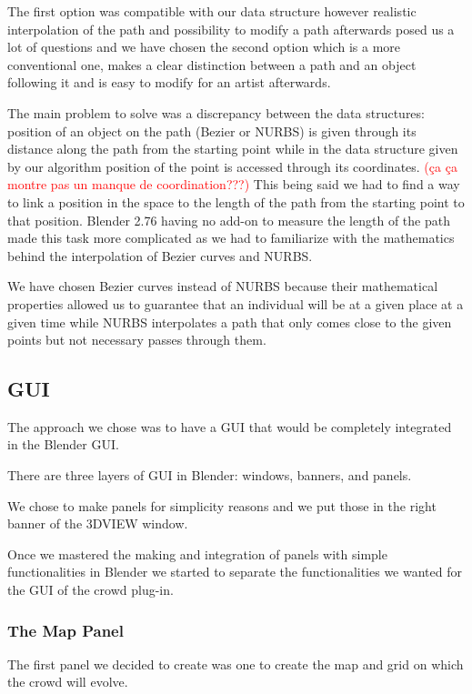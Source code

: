 The first option was compatible with our data structure however
realistic interpolation of the path and possibility to modify a path
afterwards posed us a lot of questions and we have chosen the second
option which is a more conventional one, makes a clear distinction
between a path and an object following it and is easy to modify for an
artist afterwards.

The main problem to solve was a discrepancy between the data
structures: position of an object on the path (Bezier or NURBS) is
given through its distance along the path from the starting point
while in the data structure given by our algorithm position of the
point is accessed through its coordinates. \textcolor{red}{(ça ça
  montre pas un manque de coordination???)}
This being said we
had to find a way to link a position in the space to the length of the
path from the starting point to that position. Blender 2.76 having no
add-on to measure the length of the path made this task more
complicated as we had to familiarize with the mathematics behind the
interpolation of Bezier curves and NURBS.

We have chosen Bezier curves instead of NURBS because their
mathematical properties allowed us to guarantee that an individual
will be at a given place at a given time while NURBS interpolates a
path that only comes close to the given points but not necessary
passes through them.

\subsection{GUI} 


The approach we chose was to have a GUI that would be completely integrated in
the Blender GUI.

There are three layers of GUI in Blender: windows, banners, and
panels.

We chose to make panels for simplicity reasons and we put those in the
right banner of the 3DVIEW window.

Once we mastered the making and integration of panels with simple
functionalities in Blender we started to separate the functionalities
we wanted for the GUI of the crowd plug-in.

\subsubsection{The Map Panel}


The first panel we decided to create was one to create the map and
grid on which the crowd will evolve.

